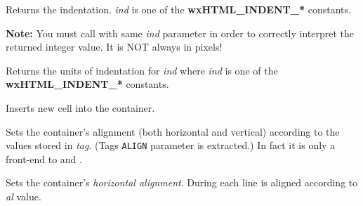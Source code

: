 \label{wxhtmlcontainercellgetindent}


Returns the indentation. {\it ind} is one of the {\bf wxHTML\_INDENT\_*} constants.

{\bf Note:} You must call  
with same {\it ind} parameter in order to correctly interpret the returned integer value.
It is NOT always in pixels!

\label{wxhtmlcontainercellgetindentunits}


Returns the units of indentation for {\it ind} where {\it ind} is one
of the {\bf wxHTML\_INDENT\_*} constants.

\label{wxhtmlcontainercellinsertcell}


Inserts new cell into the container.

\label{wxhtmlcontainercellsetalign}


Sets the container's alignment (both horizontal and vertical) according to
the values stored in {\it tag}. (Tags {\tt ALIGN} parameter is extracted.) In fact
it is only a front-end to  
and .

\label{wxhtmlcontainercellsetalignhor}


Sets the container's {\it horizontal alignment}. During  
each line is aligned according to {\it al} value.



